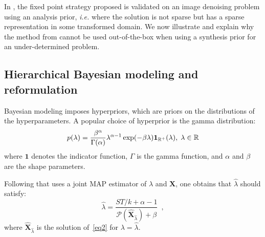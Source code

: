 In \cite{Figueiredo}, the fixed point strategy proposed is validated
on an image denoising problem using an analysis prior,
\textit{i.e.} where the solution is not sparse but has a sparse representation
in some transformed domain. We now illustrate and explain why the method
from \cite{Figueiredo} cannot be used out-of-the-box when using
a synthesis prior for an under-determined problem.


\subsection{Hierarchical Bayesian modeling and reformulation}

Bayesian modeling imposes hyperpriors, which are priors on the distributions of the hyperparameters. A popular choice of hyperprior is the gamma distribution:
\begin{equation} \label{eq3}
	p(\lambda) = \frac{\beta^\alpha}{\Gamma(\alpha)}\lambda^{\alpha-1}\exp(-\beta\lambda)\mathbf{1}_{\mathbb{R}^+}(\lambda), \; \lambda \in \mathbb{R}
\end{equation}
where $\mathbf{1}$ denotes the indicator function, $\Gamma$ is the gamma function, and $\alpha$ and $\beta$ are the shape parameters.

Following \cite{Figueiredo} that uses a joint MAP estimator of $\lambda$ and $\mathbf{X}$, one obtains that $\hat{\lambda}$ should satisfy:
\begin{equation} \label{eq4}
	\hat{\lambda} = \frac{ST/k + \alpha - 1}{\mathcal{P}(\mathbf{\hat{X}}_{\hat{\lambda}}) + \beta} \enspace ,
\end{equation}
where $\mathbf{\hat{X}}_{\hat{\lambda}}$ is the solution of~\eqref{eq2} for $\lambda = \hat{\lambda}$.

